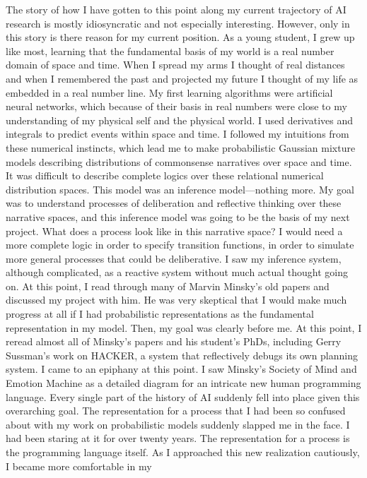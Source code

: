 The story of how I have gotten to this point along my current
trajectory of AI research is mostly idiosyncratic and not especially
interesting.  However, only in this story is there reason for my
current position.  As a young student, I grew up like most, learning
that the fundamental basis of my world is a real number domain of
space and time.  When I spread my arms I thought of real distances and
when I remembered the past and projected my future I thought of my
life as embedded in a real number line.  My first learning algorithms
were artificial neural networks, which because of their basis in real
numbers were close to my understanding of my physical self and the
physical world.  I used derivatives and integrals to predict events
within space and time.  I followed my intuitions from these numerical
instincts, which lead me to make probabilistic Gaussian mixture models
describing distributions of commonsense narratives over space and
time.  It was difficult to describe complete logics over these
relational numerical distribution spaces.  This model was an inference
model---nothing more.  My goal was to understand processes of
deliberation and reflective thinking over these narrative spaces, and
this inference model was going to be the basis of my next project.
What does a process look like in this narrative space?  I would need a
more complete logic in order to specify transition functions, in order
to simulate more general processes that could be deliberative.  I saw
my inference system, although complicated, as a reactive system
without much actual thought going on.  At this point, I read through
many of Marvin Minsky's old papers and discussed my project with him.
He was very skeptical that I would make much progress at all if I had
probabilistic representations as the fundamental representation in my
model.  Then, my goal was clearly before me.  At this point, I reread
almost all of Minsky's papers and his student's PhDs, including Gerry
Sussman's work on HACKER, a system that reflectively debugs its own
planning system.  I came to an epiphany at this point.  I saw Minsky's
Society of Mind and Emotion Machine as a detailed diagram for an
intricate new human programming language.  Every single part of the
history of AI suddenly fell into place given this overarching goal.
The representation for a process that I had been so confused about
with my work on probabilistic models suddenly slapped me in the face.
I had been staring at it for over twenty years.  The representation
for a process is the programming language itself.  As I approached
this new realization cautiously, I became more comfortable in my
